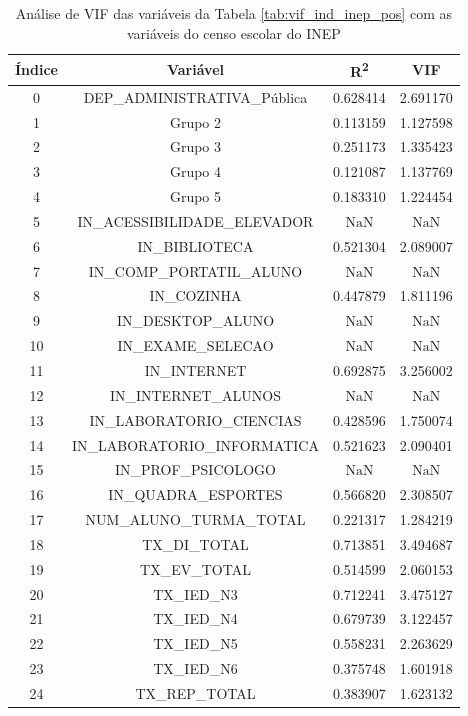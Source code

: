 \documentclass[english, spanish, brazilian]{RBIEarticle} %
\begin{document}
 \begin{table}[H]
\centering
\begin{tabular}{cccc}
\hline
\textbf{Índice} & \textbf{Variável} & \textbf{R\textsuperscript{2}} & \textbf{VIF} \\ 
\hline
0  & DEP\_ADMINISTRATIVA\_Pública & 0.628414 & 2.691170 \\
1  & Grupo 2                       & 0.113159 & 1.127598 \\
2  & Grupo 3                       & 0.251173 & 1.335423 \\
3  & Grupo 4                       & 0.121087 & 1.137769 \\
4  & Grupo 5                       & 0.183310 & 1.224454 \\
5  & IN\_ACESSIBILIDADE\_ELEVADOR  & $\text{NaN}$ & $\text{NaN}$ \\
6  & IN\_BIBLIOTECA                & 0.521304 & 2.089007 \\
7  & IN\_COMP\_PORTATIL\_ALUNO     & $\text{NaN}$ & $\text{NaN}$ \\
8  & IN\_COZINHA                   & 0.447879 & 1.811196 \\
9  & IN\_DESKTOP\_ALUNO            & $\text{NaN}$ & $\text{NaN}$ \\
10 & IN\_EXAME\_SELECAO            & $\text{NaN}$ & $\text{NaN}$ \\
11 & IN\_INTERNET                  & 0.692875 & 3.256002 \\
12 & IN\_INTERNET\_ALUNOS          & $\text{NaN}$ & $\text{NaN}$ \\
13 & IN\_LABORATORIO\_CIENCIAS     & 0.428596 & 1.750074 \\
14 & IN\_LABORATORIO\_INFORMATICA  & 0.521623 & 2.090401 \\
15 & IN\_PROF\_PSICOLOGO           & $\text{NaN}$ & $\text{NaN}$ \\
16 & IN\_QUADRA\_ESPORTES          & 0.566820 & 2.308507 \\
17 & NUM\_ALUNO\_TURMA\_TOTAL      & 0.221317 & 1.284219 \\
18 & TX\_DI\_TOTAL                 & 0.713851 & 3.494687 \\
19 & TX\_EV\_TOTAL                 & 0.514599 & 2.060153 \\
20 & TX\_IED\_N3                   & 0.712241 & 3.475127 \\
21 & TX\_IED\_N4                   & 0.679739 & 3.122457 \\
22 & TX\_IED\_N5                   & 0.558231 & 2.263629 \\
23 & TX\_IED\_N6                   & 0.375748 & 1.601918 \\
24 & TX\_REP\_TOTAL                & 0.383907 & 1.623132 \\
\hline
\end{tabular}
\caption{Análise de VIF das variáveis da Tabela \ref{tab:vif_ind_inep_pos} com as variáveis do censo escolar do INEP}
\label{tab:vif_ind_censo_pre}
\end{table} 
\end{document}

